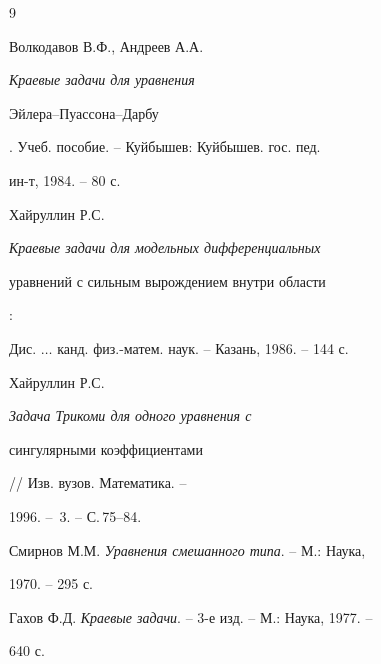  


\begin{thebibliography}{9} 


 




Волкодавов В.Ф., Андреев А.А. {\em Краевые задачи для уравнения 


Эйлера--Пуассона--Дарбу}. Учеб. пособие. -- Куйбышев: Куйбышев. гос. пед. 


ин-т, 1984. -- 80 с. 




Хайруллин Р.С. {\em Краевые задачи для модельных дифференциальных 


уравнений с сильным вырождением внутри области}: 


Дис. $\dotsc$ канд. физ.-матем. наук. -- Казань, 1986. -- 144 с. 




Хайруллин Р.С. {\em Задача Трикоми для одного уравнения с 


сингулярными коэффициентами} // Изв. вузов. Математика. -- 


1996. -- \No\,3. -- С.\,75--84. 




Смирнов М.М. {\em Уравнения смешанного типа}. -- М.: Наука, 


1970. -- 295 с. 




Гахов Ф.Д. {\em Краевые задачи}. -- 3-е изд. -- М.: Наука, 1977. -- 


640 с. 


 


\end{thebibliography} 


 


\vskip 2cm 


 








 


\label{end} 


 


 


